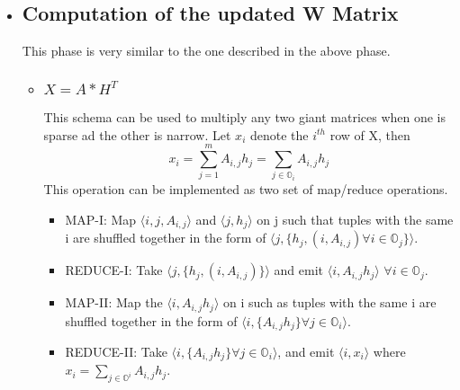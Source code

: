 \documentclass[a4paper,12pt]{article}
\begin{document}
\begin{itemize}
\begin{itemize}
\begin{itemize}
          \end{itemize}

     \end{itemize}
	
	\item \subsection{Computation of the updated W Matrix}
    This phase is very similar to the one described in the above
    phase.

    \begin{itemize}
      \item \subsubsection{$ X = A * H^T $}
        This schema can be used to multiply any two giant matrices when one
        is sparse ad the other is narrow. Let $x_i$ denote the $i^{th}$ row of X, then 
        $$ x_i = \sum_{j=1}^{m} A_{i,j} h_{j} = \sum_{j \in \mathbb{O}_i} A_{i,j} h_{j} $$
        This operation can be implemented as two set of map/reduce
        operations.
        \begin{itemize}
          \item MAP-I: Map $ \langle i, j, A_{i,j} \rangle $ and $\langle j, h_j \rangle$ on j
            such that tuples with the same i are shuffled together in
            the form of  $ \langle j, \{h_{j}, (i, A_{i,j}) \forall i \in \mathbb{O}_j \} \rangle$.

         \item REDUCE-I: Take  $ \langle j, \{h_{j}, (i, A_{i,j}) \}
           \rangle$ and emit  $ \langle i, A_{i,j}  h_{j} \rangle$ $\forall i \in \mathbb{O}_j $.

          \item MAP-II: Map the $ \langle i, A_{i,j}  h_{j} \rangle$ on i such as tuples with the 
            same i are shuffled together in the form of $ \langle i, \{A_{i,j}  h_{j} \}
           \forall j \in \mathbb{O}_i \rangle$.

          \item REDUCE-II: Take $ \langle i, \{A_{i,j}  h_{j} \}
           \forall j \in \mathbb{O}_i \rangle$, and emit $\langle i,
           x_i \rangle$ where $ x_i = \sum_{j \in \mathbb{O}^i} A_{i,j}  h_{j} $.

         \end{itemize}


\end{itemize}
\end{itemize}
\end{document}
